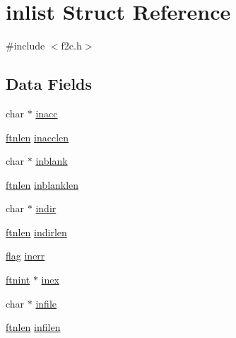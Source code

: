 \hypertarget{structinlist}{}\section{inlist Struct Reference}
\label{structinlist}


{\ttfamily \#include $<$f2c.\+h$>$}

\subsection*{Data Fields}
\begin{DoxyCompactItemize}
\item 
char $\ast$ \hyperlink{structinlist_a90629aebbca70e409e407832c708d52f}{inacc}
\item 
\hyperlink{dependencies_2third-party_2clapack_23_82_81_2_f2_c_l_i_b_s_2libf2c_2f2c_8h_a2ad57b5f7f73e0131623aa6dbff6d3f3}{ftnlen} \hyperlink{structinlist_a78dde025010d1d60468984985467e5a5}{inacclen}
\item 
char $\ast$ \hyperlink{structinlist_a1482d75fb9eb997602cb8ab7f5935155}{inblank}
\item 
\hyperlink{dependencies_2third-party_2clapack_23_82_81_2_f2_c_l_i_b_s_2libf2c_2f2c_8h_a2ad57b5f7f73e0131623aa6dbff6d3f3}{ftnlen} \hyperlink{structinlist_a2aec2496017c66c3ba0d96adcb2b37a0}{inblanklen}
\item 
char $\ast$ \hyperlink{structinlist_a29c354697f6cb16b7a5105ff4b7400b5}{indir}
\item 
\hyperlink{dependencies_2third-party_2clapack_23_82_81_2_f2_c_l_i_b_s_2libf2c_2f2c_8h_a2ad57b5f7f73e0131623aa6dbff6d3f3}{ftnlen} \hyperlink{structinlist_a17804ade39a70636a3f8ff551847b7b1}{indirlen}
\item 
\hyperlink{dependencies_2third-party_2clapack_23_82_81_2_f2_c_l_i_b_s_2libf2c_2f2c_8h_abf5d144da384425ae6cb542ce6eec8d3}{flag} \hyperlink{structinlist_a58bf72b64fab5d27aa0f7ef878d5c8d2}{inerr}
\item 
\hyperlink{dependencies_2third-party_2clapack_23_82_81_2_f2_c_l_i_b_s_2libf2c_2f2c_8h_a9d70cdb573fb2bf020e1f6dba85fb1cc}{ftnint} $\ast$ \hyperlink{structinlist_adcbe3ffd895cc077569036c4e442c7ad}{inex}
\item 
char $\ast$ \hyperlink{structinlist_a4c1905ad4f4b66c619c6e21670c1799d}{infile}
\item 
\hyperlink{dependencies_2third-party_2clapack_23_82_81_2_f2_c_l_i_b_s_2libf2c_2f2c_8h_a2ad57b5f7f73e0131623aa6dbff6d3f3}{ftnlen} \hyperlink{structinlist_a09d868ed15261e31dfe2d6471d3f73e1}{infilen}

\end{DoxyCompactItemize}
